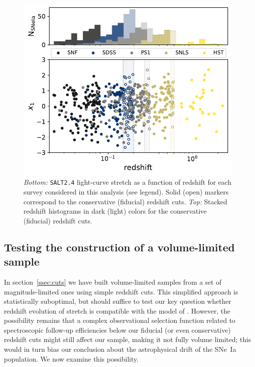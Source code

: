 \documentclass[]{aa}
\begin{document}
\begin{figure}
    \centering
    \includegraphics[width=0.95\linewidth]{Article_figures/stretchs-cut_btw_hist_stac_75-lb-cividis.pdf}
    \caption{\textit{Bottom:} \textsc{\texttt{SALT2.4}} light-curve stretch as a
        function of redshift for each survey considered in this analysis (see
        legend). Solid (open) markers correspond to the conservative (fiducial)
        redshift cuts. \textit{Top:} Stacked redshift histograms in dark (light)
    colors for the conservative (fiducial) redshift cuts.}
    \label{fig:sample}
\end{figure}

\subsection{Testing the construction of a volume-limited
sample}\label{ssec:verify}

In section~\ref{ssec:cuts} we have built volume-limited samples from a set of
magnitude-limited ones using simple redshift cuts. This simplified approach is
statistically suboptimal, but should suffice to test our key question whether
redshift evolution of stretch is compatible with the model of
\cite{rigault2020}. However, the possibility remains that a complex
observational selection function related to spectroscopic follow-up efficiencies
below our fiducial (or even conservative) redshift cuts might still affect our
sample, making it not fully volume limited; this would in turn bias our
conclusion about the astrophysical drift of the SNe~Ia population. We now
examine this possibility.
\end{document}
